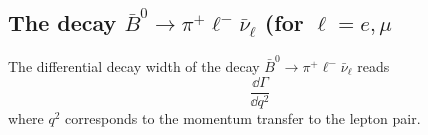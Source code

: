 \subsection{The decay $\bar{B}^0\to \pi^+ \ell^- \bar\nu_\ell$ (for $\ell = e,\mu$}
\label{sec:physics:b-mesons:cc:Btopi-semileptonic}

The differential decay width of the decay $\bar{B}^0\to \pi^+\ell^-\bar\nu_\ell$ reads \cite{Bourrely:2008za}
\begin{equation}
    \frac{\dd \Gamma}{\dd q^2}
\end{equation}
where $q^2$ corresponds to the momentum transfer to the lepton pair.
